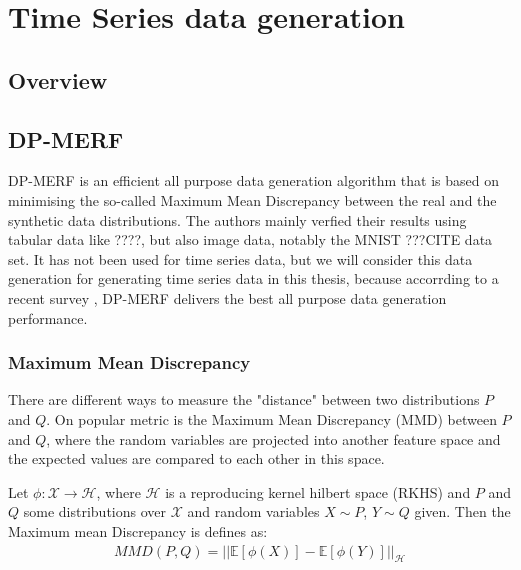 \section[(Time Series) Data generation]{Time Series data generation}
\subsection{Overview}
\subsection{DP-MERF}

DP-MERF \parencite{dpmerf} is an efficient all purpose data generation algorithm that is based on minimising the so-called Maximum Mean Discrepancy between the real and the synthetic data distributions. The authors mainly verfied their results using tabular data like ????, but also image data, notably the MNIST ???CITE data set. It has not been used for time series data, but we will consider this data generation for generating time series data in this thesis, because accorrding to a recent survey \parencite{hu2023sok}, DP-MERF delivers the best all purpose data generation performance.

\subsubsection{Maximum Mean Discrepancy}
There are different ways to measure the "distance" between two distributions $P$ and $Q$. On popular metric is the Maximum Mean Discrepancy (MMD) between $P$ and $Q$, where the random variables are projected into another feature space and the expected values are compared to each other in this space.

\begin{definition}[MMD]
    Let $\phi: \mathcal{X} \rightarrow \mathcal{H}$, where $\mathcal{H}$ is a reproducing kernel hilbert space (RKHS) and $P$ and $Q$ some distributions over $\mathcal{X}$ and random variables $X \sim P$, $Y \sim Q$ given. Then the Maximum mean Discrepancy is defines as:
    \begin{align}
        MMD(P,Q)=|| \mathbb{E}[\phi(X)] - \mathbb{E}[\phi(Y)] ||_\mathcal{H}
    \end{align}
\end{definition}

